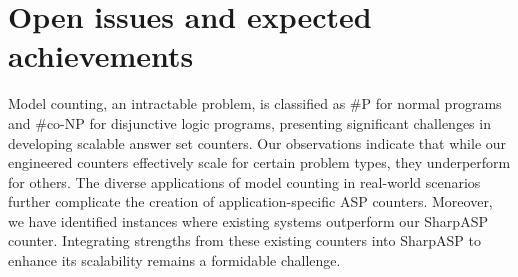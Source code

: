 \section{Open issues and expected achievements}
Model counting, an intractable problem, is classified as \#P for normal programs and \#co-NP
\cite{FHMW2017} for disjunctive logic programs, presenting significant challenges in developing scalable answer set counters. Our observations indicate that while our engineered counters effectively scale for certain problem types, they underperform for others. The diverse applications of model counting in real-world scenarios further complicate the creation of application-specific ASP counters. Moreover, we have identified instances where existing systems outperform our SharpASP counter. Integrating strengths from these existing counters into SharpASP to enhance its scalability remains a formidable challenge.